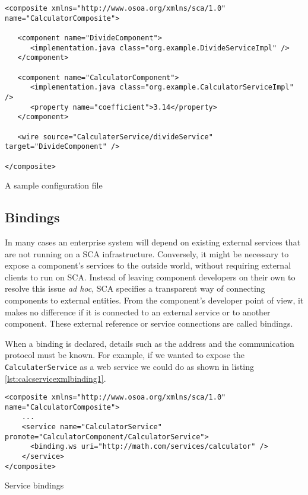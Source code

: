 \begin{listing}
\begin{verbatim}
<composite xmlns="http://www.osoa.org/xmlns/sca/1.0" name="CalculatorComposite">

   <component name="DivideComponent">
      <implementation.java class="org.example.DivideServiceImpl" />
   </component>

   <component name="CalculatorComponent">
      <implementation.java class="org.example.CalculatorServiceImpl" />
      <property name="coefficient">3.14</property>
   </component>
   
   <wire source="CalculaterService/divideService" target="DivideComponent" />

</composite>
\end{verbatim}
\caption{A sample configuration file}
\label{lst:calcservicexmlwires}
\end{listing}

\subsection{Bindings}

In many cases an enterprise system will depend on existing external services that are not running on a SCA infrastructure.
Conversely, it might be necessary to expose a component's services to the outside world, without requiring external clients
to run on SCA. Instead of leaving component developers on their own to resolve this issue \emph{ad hoc}, SCA specifies
a transparent way of connecting components to external entities. From the component's developer point of view, it makes
no difference if it is connected to an external service or to another component. These external reference or service
connections are called bindings.

When a binding is declared, details such as the address and the communication protocol must be known. For example, if we
wanted to expose the \texttt{CalculaterService} as a web service we could do as shown in listing \ref{lst:calcservicexmlbinding1}.

\begin{listing}
\begin{verbatim}
<composite xmlns="http://www.osoa.org/xmlns/sca/1.0" name="CalculatorComposite">
    ...
    <service name="CalculatorService" promote="CalculatorComponent/CalculatorService">
      <binding.ws uri="http://math.com/services/calculator" />
    </service>
</composite>
\end{verbatim}
\caption{Service bindings}
\label{lst:calcservicexmlbinding1}
\end{listing}

